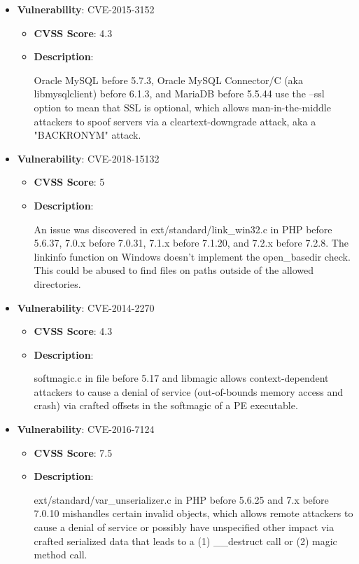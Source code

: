 \documentclass{article}
\begin{document}
\begin{itemize}
        \item \textbf{Vulnerability}: CVE-2015-3152
        \begin{itemize}
            \item \textbf{CVSS Score}:  4.3 
            \item \textbf{Description}:
            \parbox[t]{0.9\linewidth}{
                \ttfamily Oracle MySQL before 5.7.3, Oracle MySQL Connector/C (aka libmysqlclient) before 6.1.3, and MariaDB before 5.5.44 use the --ssl option to mean that SSL is optional, which allows man-in-the-middle attackers to spoof servers via a cleartext-downgrade attack, aka a "BACKRONYM" attack.
            }
        \end{itemize}
    
        \item \textbf{Vulnerability}: CVE-2018-15132
        \begin{itemize}
            \item \textbf{CVSS Score}:  5 
            \item \textbf{Description}:
            \parbox[t]{0.9\linewidth}{
                \ttfamily An issue was discovered in ext/standard/link\_win32.c in PHP before 5.6.37, 7.0.x before 7.0.31, 7.1.x before 7.1.20, and 7.2.x before 7.2.8. The linkinfo function on Windows doesn't implement the open\_basedir check. This could be abused to find files on paths outside of the allowed directories.
            }
        \end{itemize}
    
        \item \textbf{Vulnerability}: CVE-2014-2270
        \begin{itemize}
            \item \textbf{CVSS Score}:  4.3 
            \item \textbf{Description}:
            \parbox[t]{0.9\linewidth}{
                \ttfamily softmagic.c in file before 5.17 and libmagic allows context-dependent attackers to cause a denial of service (out-of-bounds memory access and crash) via crafted offsets in the softmagic of a PE executable.
            }
        \end{itemize}
    
        \item \textbf{Vulnerability}: CVE-2016-7124
        \begin{itemize}
            \item \textbf{CVSS Score}:  7.5 
            \item \textbf{Description}:
            \parbox[t]{0.9\linewidth}{
                \ttfamily ext/standard/var\_unserializer.c in PHP before 5.6.25 and 7.x before 7.0.10 mishandles certain invalid objects, which allows remote attackers to cause a denial of service or possibly have unspecified other impact via crafted serialized data that leads to a (1) \_\_destruct call or (2) magic method call.
            }
        \end{itemize}
    

\end{itemize}
\end{document}
